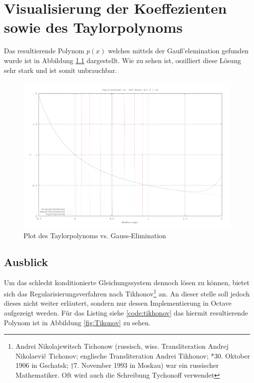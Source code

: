 \chapter{Visualisierung der Koeffezienten sowie des Taylorpolynoms}
Das resultierende Polynom \(p\left(x\right)\) welches mittels der Gauß'elemination gefunden wurde
ist in Abbildung \ref{fig:TaylorVsGauss} dargestellt. Wie zu sehen ist, oszilliert diese Lösung sehr
stark und ist somit unbrauchbar.

\begin{figure}[H]
    \vspace{-1em}
    \begin{center}
        \includegraphics[width=\textwidth]{img/aufgabe5.pdf}
    \end{center}
    \vspace{-1em}
    \caption{Plot des Taylorpolynoms vs. Gauss-Elimination}
    \label{fig:TaylorVsGauss}
\end{figure}

\newpage
\section{Ausblick}
Um das schlecht konditionierte Gleichungssystem dennoch lösen zu können, bietet sich das
Regularisierungsverfahren nach Tikhonov\footnote{Andrei Nikolajewitsch Tichonow (russisch, wiss.
Transliteration Andrej Nikolaevič Tichonov; englische
Transliteration Andrei Tikhonov; *30. Oktober 1906 in Gschatsk; †7. November 1993 in Moskau) war ein
russischer Mathematiker. Oft wird auch die Schreibung Tychonoff verwendet} an. An dieser stelle soll
jedoch dieses nicht weiter erläutert, sondern nur dessen Implementierung in Octave aufgezeigt
werden. Für das Listing siehe \ref{code:tikhonov} das hiermit resultierende Polynom ist in Abbildung
\ref{fig:Tikonov} zu sehen.

